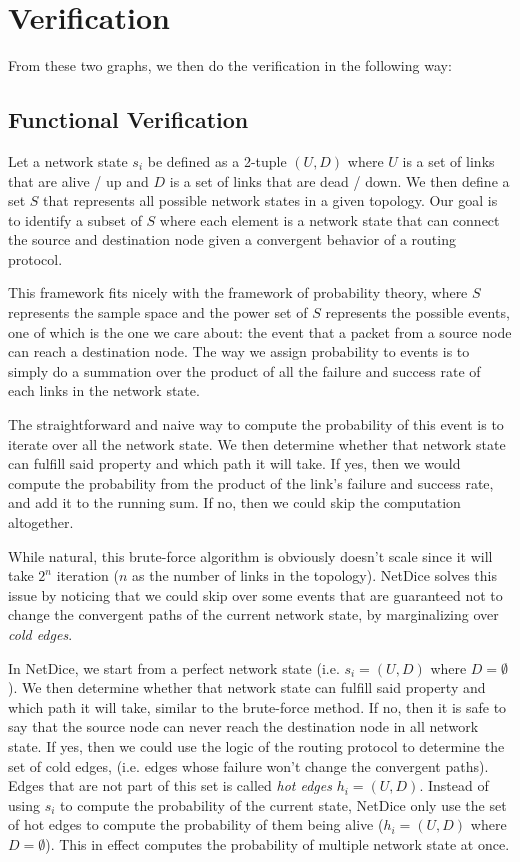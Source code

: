 \documentclass[10pt,sigconf,letterpaper,anonymous,nonacm]{acmart}
\begin{document}
\section{Verification}
From these two graphs, we then do the verification in the following way:

\subsection{Functional Verification}
Let a network state $s_i$ be defined as a 2-tuple $(U, D)$ where $U$ is a set of links that are 
alive / up and $D$ is a set of links that are dead / down.
We then define a set $S$ that represents all possible network states in a given topology. 
Our goal is to identify a subset of $S$ where each element is a network state that can connect 
the source and destination node given a convergent behavior of a routing protocol.

This framework fits nicely with the framework of probability theory, where $S$ represents the 
sample space and the power set of $S$ represents the possible events, one of which is the one
we care about: the event that a packet from a source node can reach a destination node.
The way we assign probability to events is to simply do a summation over the product of all the 
failure and success rate of each links in the network state.

The straightforward and naive way to compute the probability of this event is to iterate over all 
the network state. 
We then determine whether that network state can fulfill said property and which path it will 
take. 
If yes, then we would compute the probability from the product of the link's failure and success 
rate, and add it to the running sum.
If no, then we could skip the computation altogether.

While natural, this brute-force algorithm is obviously doesn't scale since it will take $2^n$ 
iteration ($n$ as the number of links in the topology). 
NetDice \cite{steffen2020probabilistic} solves this issue by noticing that we could skip over some 
events that are guaranteed not to change the convergent paths of the current network state, by 
marginalizing over \textit{cold edges}.

In NetDice, we start from a perfect network state (i.e. $s_i = (U, D)$ where $D = \emptyset$).
We then determine whether that network state can fulfill said property and which path it will 
take, similar to the brute-force method.
If no, then it is safe to say that the source node can never reach the destination node in all 
network state.
If yes, then we could use the logic of the routing protocol to determine the set of cold edges, 
(i.e. edges whose failure won't change the convergent paths). 
Edges that are not part of this set is called \textit{hot edges} $h_i = (U, D)$.
Instead of using $s_i$ to compute the probability of the current state, NetDice only use the set 
of hot edges to compute the probability of them being alive ($h_i = (U, D)$ where $D = \emptyset$).
This in effect computes the probability of multiple network state at once.
\end{document}
